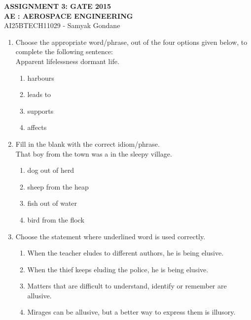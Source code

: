 \documentclass{article}
\begin{document}
\begin{center}
\large
    \textbf{ASSIGNMENT 3: GATE 2015 \\ AE : AEROSPACE ENGINEERING}\\
    AI25BTECH11029 - Samyak Gondane
\end{center}



\begin{enumerate}

\item Choose the appropriate word/phrase, out of the four options given below, to complete the following sentence:\\
Apparent lifelessness \underline{\hspace{2cm}} dormant life.
\begin{multicols}{4}
\begin{enumerate}
\item harbours   
\item leads to   
\item supports   
\item affects
\end{enumerate}
\end{multicols}

\item Fill in the blank with the correct idiom/phrase.\\
That boy from the town was a \underline{\hspace{2cm}} in the sleepy village.
\begin{multicols}{4}
\begin{enumerate}
\item dog out of herd
\item sheep from the heap
\item fish out of water
\item bird from the flock
\end{enumerate}
\end{multicols}

\item Choose the statement where underlined word is used correctly.
\begin{enumerate}
\item When the teacher eludes to different authors, he is being elusive.
\item When the thief keeps eluding the police, he is being elusive.

\item Matters that are difficult to understand, identify or remember are allusive.
\item Mirages can be allusive, but a better way to express them is illusory.
\end{enumerate}


\end{enumerate}
\end{document}
